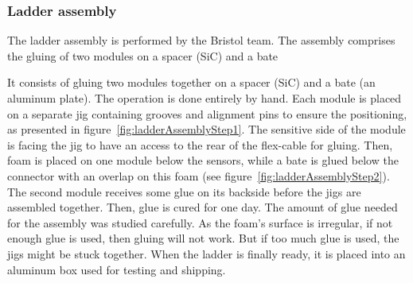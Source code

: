     \subsubsection{Ladder assembly}

    The ladder assembly is performed by the Bristol team.     
    The assembly comprises the gluing of two modules on a spacer (\gls{SiC}) and a bate 

    It consists of gluing two modules together on a spacer (\gls{SiC}) and a bate (an aluminum plate).
    The operation is done entirely by hand.
    Each module is placed on a separate jig containing grooves and alignment pins to ensure the positioning, as presented in figure~\ref{fig:ladderAssemblyStep1}.
    The sensitive side of the module is facing the jig to have an access to the rear of the flex-cable for gluing.
    Then, foam is placed on one module below the sensors, while a bate is glued below the connector with an overlap on this foam (see figure~\ref{fig:ladderAssemblyStep2}).
    The second module receives some glue on its backside before the jigs are assembled together.
    Then, glue is cured for one day.
    The amount of glue needed for the assembly was studied carefully. 
    As the foam's surface is irregular, if not enough glue is used, then gluing will not work.
    But if too much glue is used, the jigs might be stuck together.
    When the ladder is finally ready, it is placed into an aluminum box used for testing and shipping.
     
